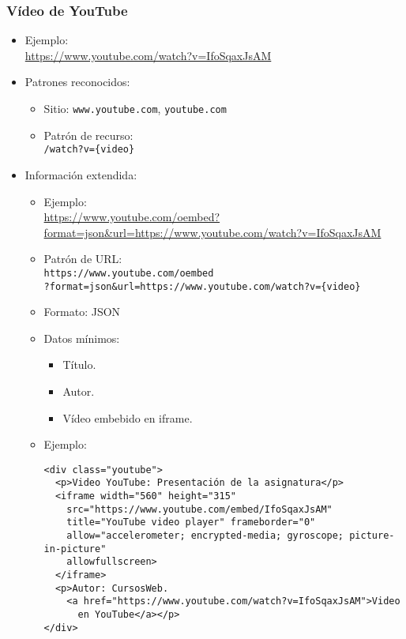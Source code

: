 \subsubsection{Vídeo de YouTube}

  \begin{itemize}
  \item Ejemplo: \\
    \url{https://www.youtube.com/watch?v=IfoSqaxJsAM}
  \item Patrones reconocidos:
    \begin{itemize}
    \item Sitio: \texttt{www.youtube.com}, \texttt{youtube.com}
    \item Patrón de recurso: \\
      \texttt{/watch?v=\{video\}}
    \end{itemize}
  \item Información extendida:
    \begin{itemize}
    \item Ejemplo: \\
      \url{https://www.youtube.com/oembed?format=json&url=https://www.youtube.com/watch?v=IfoSqaxJsAM}
    \item Patrón de URL:\\
      \texttt{https://www.youtube.com/oembed}\\
      \texttt{?format=json\&url=https://www.youtube.com/watch?v=\{video\}}
    \item Formato: JSON
    \item Datos mínimos:
      \begin{itemize}
      \item Título.
      \item Autor.
      \item Vídeo embebido en iframe.
      \end{itemize}
    \item Ejemplo:

{\footnotesize
\begin{verbatim}
<div class="youtube">
  <p>Video YouTube: Presentación de la asignatura</p>
  <iframe width="560" height="315"
    src="https://www.youtube.com/embed/IfoSqaxJsAM"
    title="YouTube video player" frameborder="0"
    allow="accelerometer; encrypted-media; gyroscope; picture-in-picture"
    allowfullscreen>
  </iframe>
  <p>Autor: CursosWeb.
    <a href="https://www.youtube.com/watch?v=IfoSqaxJsAM">Video
      en YouTube</a></p>
</div>
\end{verbatim}
}
    \end{itemize}
  \end{itemize}


